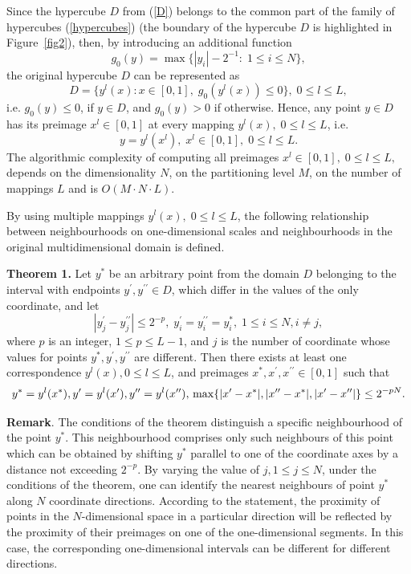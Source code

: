 \documentclass[entropy,article,submit,moreauthors,pdftex]{Definitions/mdpi}
\begin{document}
Since the hypercube $D$ from (\ref{D}) belongs to the common part of the family of hypercubes (\ref{hypercubes}) (the boundary of the hypercube $D$ is highlighted in Figure~\ref{fig2}), then, by introducing an additional function 
\[
g_0(y) = \max \{ |y_i|-2^{-1}: \; 1 \leq i \leq N \},
\] 
the original hypercube $D$ can be represented as
\[
D = \{y^l(x): x \in [0,1], \; g_0(y^l(x)) \leq 0 \}, \; 0 \leq l \leq L,
\] 
i.e. $g_0(y) \leq 0$, if $y \in D$, and $g_0(y) > 0$ if otherwise. Hence, any point $y \in D$ has its preimage $x^l \in [0,1]$ at every mapping $y^l(x), \; 0 \leq l \leq L$, i.e.
\[
y = y^l(x^l), \; x^l \in [0, 1], \; 0 \leq l \leq L.
\] 
\textcolor[rgb]{1,0,0}{The algorithmic complexity of computing all preimages $x^l \in [0, 1], \; 0 \leq l \leq L,$ depends on the dimensionality $N$, on the partitioning level $M$, on the number of mappings $L$ and is $O(M\cdot N \cdot L)$.}

By using multiple mappings $y^l(x), \; 0 \leq l \leq L$, the following relationship between neighbourhoods on one-dimensional scales and neighbourhoods in the original multidimensional domain is defined.

\textbf{Theorem 1.} Let $y^*$ be an arbitrary point from the domain $D$ belonging to the interval with endpoints $y^\prime, y^{\prime\prime} \in D$, which differ in the values of the only coordinate, and let
\begin{equation}\label{y_prime}
|y_j^\prime - y^{\prime\prime}_j| \leq 2^{-p}, \; y^\prime_i = y^{\prime\prime}_i = y_i^*, \; 1 \leq i \leq N, i \ne j,
\end{equation} 
where $p$ is an integer, $1 \leq p \leq L-1$, and $j$ is the number of coordinate whose values for points $y^*, y^\prime, y^{\prime\prime}$ are different. Then there exists at least one correspondence $y^l(x), 0 \leq l \leq L$, and preimages $x^*, x^\prime, x^{\prime\prime} \in [0, 1]$ such that
\[
 y^* = y^l(x^*), y^\prime = y^l(x^\prime), y^{\prime\prime} = y^l(x^{\prime\prime}), \\
\max \{ |x^\prime - x^*|, |x^{\prime\prime} - x^*|, |x^\prime - x^{\prime\prime}| \} \leq 2^{-pN}.
\] 

\textbf{Remark}. The conditions of the theorem distinguish a specific neighbourhood of the point $y^*$. This neighbourhood comprises only such neighbours of this point which can be obtained by  shifting $y^*$ parallel to one of the coordinate axes by a distance not exceeding $2^{-p}$. By varying the value of $j, 1 \leq j \leq N$, under the conditions of the theorem, one can identify the nearest neighbours of point $y^*$ along $N$ coordinate directions. According to the statement, the proximity of points in the $N$-dimensional space in a particular direction will be reflected by the proximity of their preimages on one of the one-dimensional segments. In this case, the corresponding one-dimensional intervals can be different for different directions.
\end{document}
